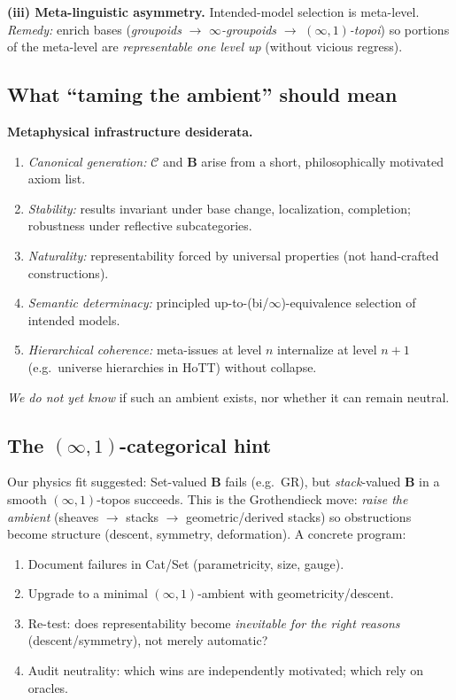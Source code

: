 \documentclass[11pt]{article}
\theoremstyle{upright}
\begin{document}
\smallskip
\textbf{(iii) Meta-linguistic asymmetry.} Intended-model selection is meta-level. \emph{Remedy:} enrich bases (\emph{groupoids} $\to$ \emph{$\infty$-groupoids} $\to$ \emph{$(\infty,1)$-topoi}) so portions of the meta-level are \emph{representable one level up} (without vicious regress).

\subsection{What ``taming the ambient'' should mean}
\textbf{Metaphysical infrastructure desiderata.}
\begin{enumerate}[leftmargin=2em,label=(D\arabic*)]
\item \emph{Canonical generation:} $\mathcal C$ and $\mathbf B$ arise from a short, philosophically motivated axiom list.
\item \emph{Stability:} results invariant under base change, localization, completion; robustness under reflective subcategories.
\item \emph{Naturality:} representability forced by universal properties (not hand-crafted constructions).
\item \emph{Semantic determinacy:} principled up-to-(bi/\(\infty\))-equivalence selection of intended models.
\item \emph{Hierarchical coherence:} meta-issues at level $n$ internalize at level $n\!+\!1$ (e.g.\ universe hierarchies in HoTT) without collapse.
\end{enumerate}
\emph{We do not yet know} if such an ambient exists, nor whether it can remain neutral.

\subsection{The $(\infty,1)$-categorical hint}
Our physics fit suggested: Set-valued $\mathbf B$ fails (e.g.\ GR), but \emph{stack}-valued $\mathbf B$ in a smooth $(\infty,1)$-topos succeeds. This is the Grothendieck move: \emph{raise the ambient} (sheaves $\to$ stacks $\to$ geometric/derived stacks) so obstructions become structure (descent, symmetry, deformation). A concrete program:
\begin{enumerate}[leftmargin=2em,label=(H\arabic*)]
\item Document failures in Cat/Set (parametricity, size, gauge).
\item Upgrade to a minimal $(\infty,1)$-ambient with geometricity/descent.
\item Re-test: does representability become \emph{inevitable for the right reasons} (descent/symmetry), not merely automatic?
\item Audit neutrality: which wins are independently motivated; which rely on oracles.
\end{enumerate}
\end{document}
